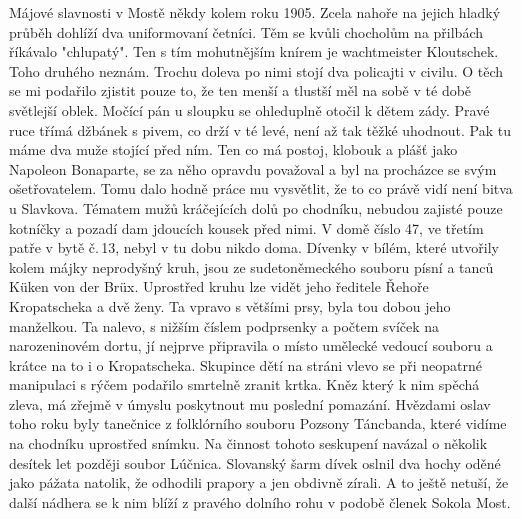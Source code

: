 
Májové slavnosti v Mostě někdy kolem roku 1905. Zcela nahoře na jejich
hladký průběh dohlíží dva uniformovaní četníci. Těm se kvůli chocholům
na přilbách říkávalo "chlupatý". Ten s tím mohutnějším knírem je
wachtmeister Kloutschek. Toho druhého neznám. Trochu doleva po nimi
stojí dva policajti v civilu. O těch se mi podařilo zjistit pouze to,
že ten menší a tlustší měl na sobě v té době světlejší oblek. Močící
pán u sloupku se ohleduplně otočil k dětem zády. Pravé ruce třímá
džbánek s pivem, co drží v té levé, není až tak těžké uhodnout. Pak tu
máme dva muže stojící před ním. Ten co má postoj, klobouk a plášť
jako Napoleon Bonaparte, se za něho opravdu považoval a byl na
procházce se svým ošetřovatelem. Tomu dalo hodně práce mu vysvětlit,
že to co právě vidí není bitva u Slavkova. Tématem mužů kráčejících
dolů po chodníku, nebudou zajisté pouze kotníčky a pozadí dam jdoucích
kousek před nimi. V domě číslo 47, ve třetím patře v bytě č.\,13, nebyl
v tu dobu nikdo doma. Dívenky v bílém, které utvořily kolem májky
neprodyšný kruh, jsou ze sudetoněmeckého souboru písní a tanců Küken
von der Brüx. Uprostřed kruhu lze vidět jeho ředitele Řehoře
Kropatscheka a dvě ženy. Ta vpravo s většími prsy, byla tou dobou jeho
manželkou. Ta nalevo, s nižším číslem podprsenky a počtem svíček na
narozeninovém dortu, jí nejprve připravila o místo umělecké vedoucí
souboru a krátce na to i o Kropatscheka. Skupince dětí na stráni vlevo
se při neopatrné manipulaci s rýčem podařilo smrtelně zranit krtka.
Kněz který k nim spěchá zleva, má zřejmě v úmyslu poskytnout mu
poslední pomazání. Hvězdami oslav toho roku byly tanečnice z
folklórního souboru Pozsony Táncbanda, které vidíme na chodníku
uprostřed snímku. Na činnost tohoto seskupení navázal o několik
desítek let později soubor Lúčnica. Slovanský šarm dívek oslnil dva
hochy oděné jako pážata natolik, že odhodili prapory a jen obdivně
zírali. A to ještě netuší, že další nádhera se k nim blíží z pravého
dolního rohu v podobě členek Sokola Most.

